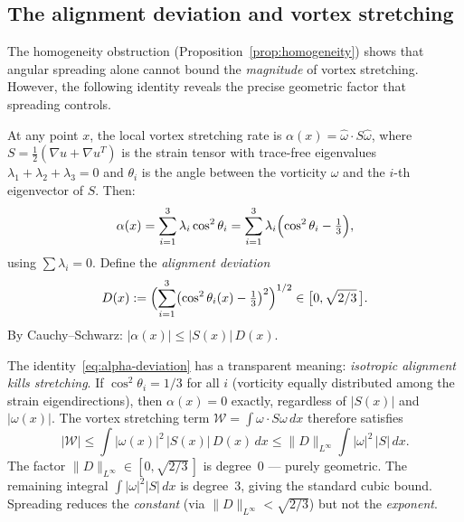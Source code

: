 \documentclass[11pt]{article}
\theoremstyle{definition}
\begin{document}
\subsection{The alignment deviation and
vortex stretching}
\label{sec:alignment}

The homogeneity obstruction
(Proposition~\ref{prop:homogeneity}) shows that
angular spreading alone cannot bound the
\emph{magnitude} of vortex stretching.  However,
the following identity reveals the precise
geometric factor that spreading controls.

At any point $x$, the local vortex stretching rate
is $\alpha(x) = \hat\omega\cdot S\hat\omega$, where
$S = \frac{1}{2}(\nabla u + \nabla u^T)$ is the
strain tensor with trace-free eigenvalues
$\lambda_1+\lambda_2+\lambda_3=0$ and $\theta_i$ is
the angle between the vorticity $\omega$ and the
$i$-th eigenvector of $S$.  Then:
\begin{equation}\label{eq:alpha-deviation}
\alpha(x) = \sum_{i=1}^3 \lambda_i\cos^2\theta_i
= \sum_{i=1}^3 \lambda_i
\Bigl(\cos^2\theta_i - \tfrac{1}{3}\Bigr),
\end{equation}
using $\sum\lambda_i=0$.  Define the
\emph{alignment deviation}
\begin{equation}\label{eq:Dalign}
D(x) := \Bigl(\sum_{i=1}^3
\bigl(\cos^2\theta_i(x)-\tfrac{1}{3}\bigr)^2
\Bigr)^{1/2} \in \bigl[0,\sqrt{2/3}\,\bigr].
\end{equation}
By Cauchy--Schwarz:
$|\alpha(x)| \leq |S(x)|\,D(x)$.

The identity~\eqref{eq:alpha-deviation} has a
transparent meaning:
\emph{isotropic alignment kills stretching}.
If $\cos^2\theta_i = 1/3$ for all $i$ (vorticity
equally distributed among the strain eigendirections),
then $\alpha(x)=0$ exactly, regardless of $|S(x)|$
and $|\omega(x)|$.  The vortex stretching term
$\mathcal{W} = \int\omega\cdot S\omega\,dx$
therefore satisfies
\begin{equation}\label{eq:W-alignment}
|\mathcal{W}| \leq \int |\omega(x)|^2\,|S(x)|\,
D(x)\,dx
\leq \|D\|_{L^\infty}\int |\omega|^2\,|S|\,dx.
\end{equation}
The factor $\|D\|_{L^\infty}\in[0,\sqrt{2/3}\,]$
is degree~0 --- purely geometric.  The remaining
integral $\int|\omega|^2|S|\,dx$ is degree~3, giving
the standard cubic bound.  Spreading reduces the
\emph{constant} (via $\|D\|_{L^\infty}<\sqrt{2/3}$)
but not the \emph{exponent}.
\end{document}

